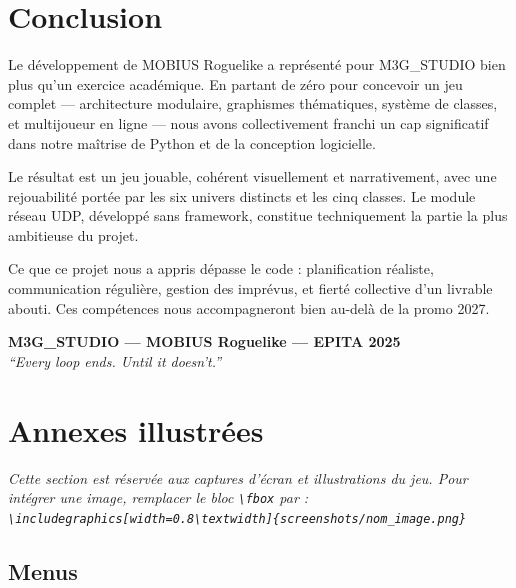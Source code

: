 \documentclass[12pt, a4paper]{report}
\begin{document}
\chapter{Conclusion}

Le d\'{e}veloppement de MOBIUS Roguelike a repr\'{e}sent\'{e} pour M3G\_STUDIO bien plus qu'un exercice acad\'{e}mique. En partant de z\'{e}ro pour concevoir un jeu complet --- architecture modulaire, graphismes th\'{e}matiques, syst\`{e}me de classes, et multijoueur en ligne --- nous avons collectivement franchi un cap significatif dans notre ma\^{i}trise de Python et de la conception logicielle.

Le r\'{e}sultat est un jeu jouable, coh\'{e}rent visuellement et narrativement, avec une rejouabilit\'{e} port\'{e}e par les six univers distincts et les cinq classes. Le module r\'{e}seau UDP, d\'{e}velopp\'{e} sans framework, constitue techniquement la partie la plus ambitieuse du projet.

Ce que ce projet nous a appris d\'{e}passe le code : planification r\'{e}aliste, communication r\'{e}guli\`{e}re, gestion des impr\'{e}vus, et fiert\'{e} collective d'un livrable abouti. Ces comp\'{e}tences nous accompagneront bien au-del\`{a} de la promo 2027.

\vspace{1cm}
\begin{center}
  \textcolor{mobiuspurple}{\large\bfseries M3G\_STUDIO --- MOBIUS Roguelike --- EPITA 2025}\\[4pt]
  \textcolor{mobiuscyan}{\textit{``Every loop ends. Until it doesn't.''}}
\end{center}

\appendix
\chapter{Annexes illustr\'{e}es}

\textit{%
  Cette section est r\'{e}serv\'{e}e aux captures d'\'{e}cran et illustrations du jeu.
  Pour int\'{e}grer une image, remplacer le bloc \texttt{\textbackslash fbox} par :\\
  \texttt{\textbackslash includegraphics[width=0.8\textbackslash textwidth]\{screenshots/nom\_image.png\}}
}

\section{Menus}
\end{document}
